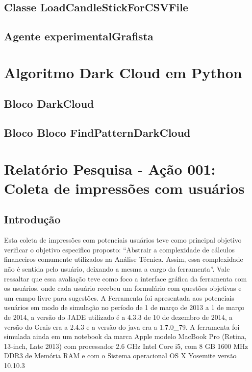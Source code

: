 \begin{apendicesenv}
\section{Classe LoadCandleStickForCSVFile}


\section{Agente experimentalGrafista}


\chapter[ALGORITMO DARK CLOUD EM  PYTHON]{Algoritmo Dark Cloud em Python}
\section{Bloco DarkCloud}


\section{Bloco Bloco FindPatternDarkCloud}


\chapter[Relatório Pesquisa - Ação 001]{Relatório Pesquisa - Ação 001: Coleta de impressões com usuários}
\section{Introdução}
Esta coleta de impressões com potenciais usuários teve como principal objetivo verificar  o objetivo especifico proposto: “Abstrair a complexidade de cálculos financeiros comumente utilizados na Análise Técnica. Assim, essa complexidade não é sentida pelo usuário, deixando a mesma a cargo da ferramenta”. Vale ressaltar que essa avaliação teve como foco a interface gráfica da ferramenta com os usuários, onde cada usuário recebeu um formulário com questões objetivas e um campo livre para sugestões.
A Ferramenta foi apresentada aos potenciais usuários em modo de simulação no período de 1 de março de 2013 a 1 de março de 2014, a versão do JADE utilizado é a 4.3.3 de 10 de dezembro de 2014, a versão do Grais era a 2.4.3 e a versão do java era a 1.7.0\_79. A ferramenta foi simulada ainda em um notebook da marca Apple modelo MacBook Pro (Retina, 13-inch, Late 2013) com processador 2.6 GHz Intel Core i5, com 8 GB 1600 MHz DDR3 de Memória RAM e com o Sistema operacional OS X Yosemite versão 10.10.3


\end{apendicesenv}

